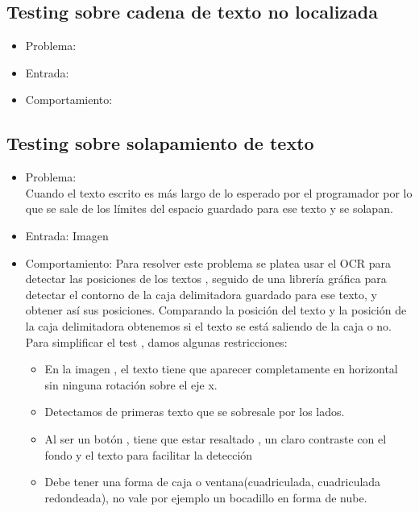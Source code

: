 \subsection{Testing sobre cadena de texto no localizada}
\begin{itemize}
	\item Problema: \\

	\item Entrada: \\

	\item Comportamiento: \\

\end{itemize}
\subsection{Testing sobre solapamiento de texto}

\begin{itemize}
	\item Problema: \\
	Cuando el texto escrito es más largo de lo esperado por el programador por lo que se sale de los límites del espacio guardado para ese texto y se solapan. \\
	\item Entrada: Imagen\\
	
	\item Comportamiento: Para resolver este problema se platea usar el OCR para detectar las posiciones de los textos , seguido de una librería gráfica para detectar el contorno de la caja delimitadora guardado para ese texto, y obtener así sus posiciones. Comparando la posición del texto y la posición de la caja delimitadora obtenemos si el texto se está saliendo de la caja o no.\\
	Para simplificar el test , damos algunas restricciones: 
	\begin{itemize}
		\item En la imagen , el texto tiene que aparecer completamente en horizontal sin ninguna rotación sobre el eje x.
		\item Detectamos de primeras texto que se sobresale por los lados.
		\item Al ser un botón , tiene que estar resaltado , un claro contraste con el fondo y el texto para facilitar la detección
		\item Debe tener una forma de caja o ventana(cuadriculada, cuadriculada redondeada), no vale por ejemplo un bocadillo en forma de nube.
	\end{itemize} 
	
\end{itemize}

